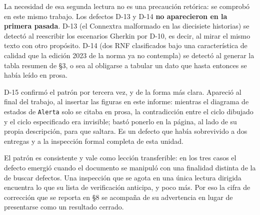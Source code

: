 La necesidad de esa segunda lectura no es una precauci\'on ret\'orica: se comprob\'o en este mismo trabajo. Los defectos D-13 y D-14 \textbf{no aparecieron en la primera pasada}. D-13 (el Connextra malformado en las diecisiete historias) se detect\'o al reescribir los escenarios Gherkin por D-10, es decir, al mirar el mismo texto con otro prop\'osito. D-14 (dos RNF clasificados bajo una caracter\'istica de calidad que la edici\'on 2023 de la norma ya no contempla) se detect\'o al generar la tabla resumen de \S3, o sea al obligarse a tabular un dato que hasta entonces se hab\'ia le\'ido en prosa.

D-15 confirm\'o el patr\'on por tercera vez, y de la forma m\'as clara. Apareci\'o al final del trabajo, al insertar las figuras en este informe: mientras el diagrama de estados de \texttt{Alerta} solo se citaba en prosa, la contradicci\'on entre el ciclo dibujado y el ciclo especificado era invisible; bast\'o ponerlo en la p\'agina, al lado de su propia descripci\'on, para que saltara. Es un defecto que hab\'ia sobrevivido a dos entregas y a la inspecci\'on formal completa de esta unidad.

El patr\'on es consistente y vale como lecci\'on transferible: en los tres casos el defecto emergi\'o cuando el documento se manipul\'o con una finalidad distinta de la de buscar defectos. Una inspecci\'on que se agota en una \'unica lectura dirigida encuentra lo que su lista de verificaci\'on anticipa, y poco m\'as. Por eso la cifra de correcci\'on que se reporta en \S8 se acompa\~na de su advertencia en lugar de presentarse como un resultado cerrado.
